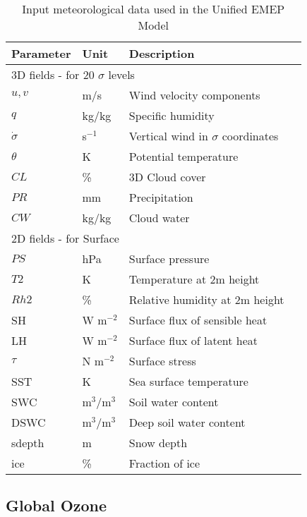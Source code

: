 \begin{table}[h!]
\caption{Input meteorological data used in the Unified EMEP Model
   \label{Tab:metinput}}
\begin{center}
\begin{tabular}{p{6cm}lll}
\hline
Parameter      & Unit & Description          \\
\hline
\multicolumn{3}{l}{3D fields - for 20 $\sigma$ levels} \\
$u,v$  &  m/s     & Wind velocity components   \\
$q$    &  kg/kg   & Specific humidity           \\
$\dot{\sigma}$ & s$^{-1}$ & Vertical wind in $\sigma$ coordinates \\
$\theta$       & K  & Potential temperature \\
$CL$             & \% & 3D Cloud cover            \\
$PR$             & mm & Precipitation         \\
$CW$             & kg/kg & Cloud water          \\
\hline
\multicolumn{3}{l}{2D fields - for Surface} \\
$PS$             & hPa & Surface pressure                     \\
$T2$          & K  & Temperature at 2m height               \\
$Rh2$             & \% & Relative humidity at 2m height \\
SH              & W m$^{-2}$ & Surface flux of sensible heat \\
LH             & W m$^{-2}$ & Surface flux of latent heat \\
$\tau$         & N m$^{-2}$ & Surface stress               \\
SST            & K & Sea surface temperature \\
SWC            & m$^3$/m$^{3}$ & Soil water content        \\
DSWC           & m$^3$/m$^{3}$ & Deep soil water content   \\
sdepth         & m & Snow depth \\
ice            & \% & Fraction of ice \\  
\hline
\end{tabular}
\end{center}
\end{table}



\subsection{Global Ozone}

